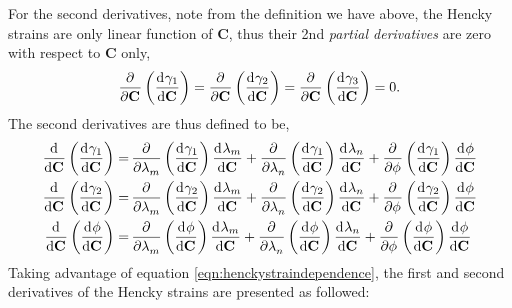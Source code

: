 	For the second derivatives, note from the definition we have above, the Hencky strains are only linear function of $\mathbf{C}$, thus their 2nd \emph{partial derivatives} are zero with respect to $\mathbf{C}$ only,
\begin{equation}
\begin{aligned}
\dpd{}{\mathbf{C}}\left(\dod{\gamma_1}{\mathbf{C}}\right) 
	=\dpd{}{\mathbf{C}}\left(\dod{\gamma_2}{\mathbf{C}}\right)
    =\dpd{}{\mathbf{C}}\left(\dod{\gamma_3}{\mathbf{C}}\right)
    =0.
\end{aligned}
\end{equation}
The second derivatives are thus defined to be,
\begin{subequations}
\begin{align}
\dod{}{\mathbf{C}}\left(\dod{\gamma_1}{\mathbf{C}}\right) =&
    \dpd{}{\lambda_m}\left(\dod{\gamma_1}{\mathbf{C}}\right)\dod{\lambda_m}{\mathbf{C}}
    + \dpd{}{\lambda_n}\left(\dod{\gamma_1}{\mathbf{C}}\right)\dod{\lambda_n}{\mathbf{C}}
    + \dpd{}{\phi}\left(\dod{\gamma_1}{\mathbf{C}}\right)\dod{\phi}{\mathbf{C}}	\\
\dod{}{\mathbf{C}}\left(\dod{\gamma_2}{\mathbf{C}}\right) =&
    \dpd{}{\lambda_m}\left(\dod{\gamma_2}{\mathbf{C}}\right)\dod{\lambda_m}{\mathbf{C}}
    + \dpd{}{\lambda_n}\left(\dod{\gamma_2}{\mathbf{C}}\right)\dod{\lambda_n}{\mathbf{C}}
    + \dpd{}{\phi}\left(\dod{\gamma_2}{\mathbf{C}}\right)\dod{\phi}{\mathbf{C}}	\\
\dod{}{\mathbf{C}}\left(\dod{\phi}{\mathbf{C}}\right) =&
    \dpd{}{\lambda_m}\left(\dod{\phi}{\mathbf{C}}\right)\dod{\lambda_m}{\mathbf{C}}
    + \dpd{}{\lambda_n}\left(\dod{\phi}{\mathbf{C}}\right)\dod{\lambda_n}{\mathbf{C}}
    + \dpd{}{\phi}\left(\dod{\phi}{\mathbf{C}}\right)\dod{\phi}{\mathbf{C}} 
\end{align}
\end{subequations}
Taking advantage of equation \ref{eqn:henckystraindependence}, the first and second derivatives of the Hencky strains are presented as followed:
